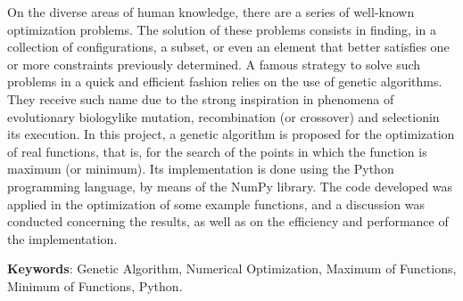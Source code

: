 On the diverse areas of human knowledge, there are a series of well-known optimization
problems. The solution of these problems consists in finding, in a collection of configurations,
a subset, or even an element that better satisfies one or more constraints previously determined. A
famous strategy to solve such problems in a quick and efficient fashion relies on the use of
genetic algorithms. They receive such name due to the strong inspiration in phenomena of
evolutionary biology\trav like mutation, recombination (or crossover) and selection\trav in its execution. 
In this project, a genetic algorithm is proposed for the
optimization of real functions, that is, for the search of the points in which the function is
maximum (or minimum). Its implementation is done using the Python programming language, by means of the NumPy library.
The code developed was applied in the optimization of some example functions, and a discussion
was conducted concerning the results, as well as on the efficiency and performance of the implementation.

\vspace{\onelineskip}\noindent
\textbf{Keywords}: Genetic Algorithm, Numerical Optimization, Maximum of Functions, Minimum of Functions, Python.
